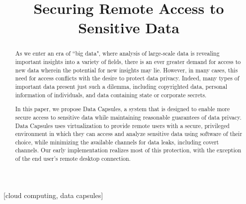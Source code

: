 \documentclass{acm_proc_article-sp}
\begin{document}
\title{Securing Remote Access to Sensitive Data}

%

\maketitle
\begin{abstract}

As we enter an era of ``big data", where analysis of large-scale data is
revealing important insights into a variety of fields, there is an ever greater
demand for access to new data wherein the potential for new insights may lie.
However, in many cases, this need for access conflicts with the desire to
protect data privacy.  Indeed, many types of important data present just such a
dilemma, including copyrighted data, personal information of individuals, and
data containing state or corporate secrets.

In this paper, we propose Data Capsules, a system that is designed to enable
more secure access to sensitive data while maintaining reasonable guarantees of
data privacy.  Data Capsules uses virtualization to provide remote users with a
secure, privileged environment in which they can access and analyze sensitive
data using software of their choice, while minimizing the available channels for
data leaks, including covert channels.  Our early implementation realizes most
of this protection, with the exception of the end user's remote desktop
connection.

\end{abstract}

[cloud computing, data capsules]
\end{document}
